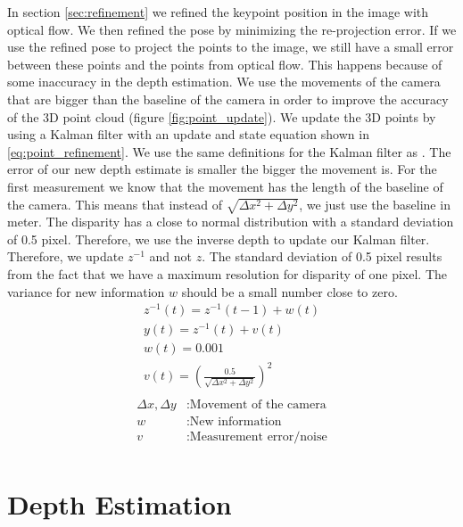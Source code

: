 \documentclass[11pt,a4paper,titlepage,oneside]{report}
\begin{document}
In section \ref{sec:refinement} we refined the keypoint position in the image with optical flow. We then refined the pose by minimizing the re-projection error. If we use the refined pose to project the points to the image, we still have a small error between these points and the points from optical flow. This happens because of some inaccuracy in the depth estimation. We use the movements of the camera that are bigger than the baseline of the camera in order to improve the accuracy of the 3D point cloud (figure \ref{fig:point_update}). We update the 3D points by using a Kalman filter with an update and state equation shown in \ref{eq:point_refinement}. We use the same definitions for the Kalman filter as \cite{statdig}. The error of our new depth estimate is smaller the bigger the movement is. For the first measurement we know that the movement has the length of the baseline of the camera. This means that instead of $\sqrt{\Delta x^2+\Delta y^2}$, we just use the baseline in meter. The disparity has a close to normal distribution with a standard deviation of 0.5 pixel. Therefore, we use the inverse depth to update our Kalman filter. Therefore, we update $z^{-1}$ and not $z$. The standard deviation of 0.5 pixel results from the fact that we have a maximum resolution for disparity of one pixel. The variance for new information $w$ should be a small number close to zero.
\begin{equation}\label{eq:point_refinement}
  \begin{gathered}
    z^{-1}(t)=z^{-1}(t-1)+w(t)\\
    y(t)=z^{-1}(t)+v(t)\\
    w(t)=0.001\\
    v(t)=(\frac{0.5}{\sqrt{\Delta x^2 + \Delta y^2}})^2\\
  \end{gathered}
\end{equation}
\begin{align*}
  \Delta x, \Delta y  &: \text{Movement of the camera}\\
  w                   &: \text{New information}\\
  v                   &: \text{Measurement error/noise}\\
\end{align*}

\chapter{Depth Estimation}\label{ch:depth}
\end{document}
